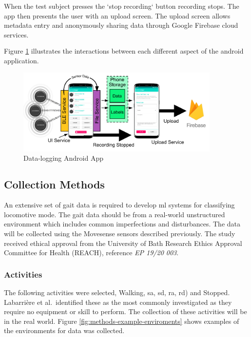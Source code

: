 When the test subject presses the `stop recording` button recording stops. The app then presents the user with an upload screen. The upload screen allows metadata entry and anonymously sharing data through Google Firebase cloud services.

Figure \ref{fig:methods-android-app} illustrates the interactions between each different aspect of the android application.

\begin{figure}[hbt]
    \centering
    \includegraphics[width=0.9\textwidth]{content/3-Methods/Android_App.pdf}
    \caption{Data-logging Android App}
    \label{fig:methods-android-app}
\end{figure}


\subsection{Collection Methods}
\label{sec:methods-data-collection}
An extensive set of gait data is required to develop \acrshort{ml} systems for classifying locomotive mode. The gait data should be from a real-world unstructured environment which includes common imperfections and disturbances. The data will be collected using the Movesense sensors described previously. The study received ethical approval from the University of Bath Research Ethics Approval Committee for Health (REACH), reference \textit{EP 19/20 003}.

\subsubsection{Activities}
The following activities were selected, Walking, \acrfull{sa}, \acrfull{sd}, \acrfull{ra}, \acrfull{rd}) and Stopped. Labarri\`ere et al.~identified these as the most commonly investigated as they require no equipment or skill to perform\cite{Labarriere2020}. The collection of these activities will be in the real world. Figure \ref{fig:methods-example-enviroments} shows examples of the environments for data was collected.

